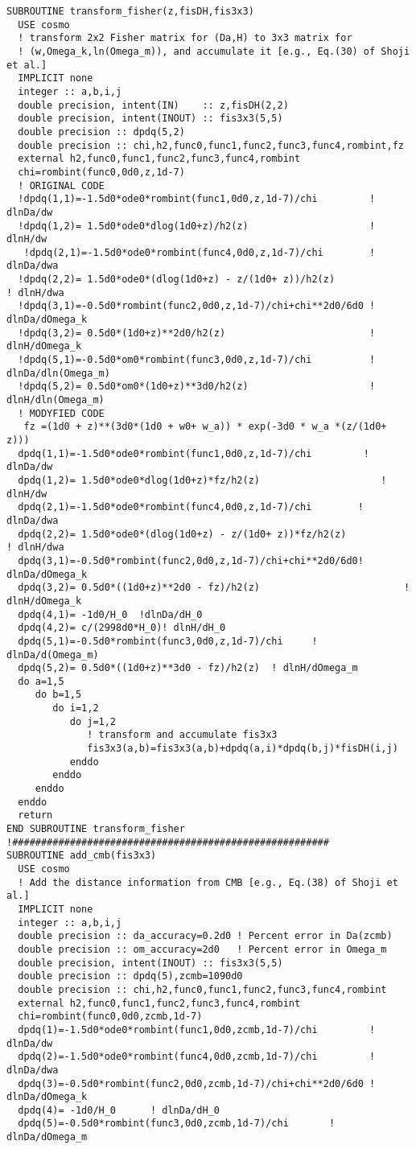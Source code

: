 \documentclass[11pt]{amsart}
\begin{document}
\begin{verbatim}
SUBROUTINE transform_fisher(z,fisDH,fis3x3)
  USE cosmo
  ! transform 2x2 Fisher matrix for (Da,H) to 3x3 matrix for 
  ! (w,Omega_k,ln(Omega_m)), and accumulate it [e.g., Eq.(30) of Shoji et al.]
  IMPLICIT none
  integer :: a,b,i,j
  double precision, intent(IN)    :: z,fisDH(2,2)
  double precision, intent(INOUT) :: fis3x3(5,5)
  double precision :: dpdq(5,2)
  double precision :: chi,h2,func0,func1,func2,func3,func4,rombint,fz
  external h2,func0,func1,func2,func3,func4,rombint
  chi=rombint(func0,0d0,z,1d-7)
  ! ORIGINAL CODE
  !dpdq(1,1)=-1.5d0*ode0*rombint(func1,0d0,z,1d-7)/chi         ! dlnDa/dw
  !dpdq(1,2)= 1.5d0*ode0*dlog(1d0+z)/h2(z)                     ! dlnH/dw
   !dpdq(2,1)=-1.5d0*ode0*rombint(func4,0d0,z,1d-7)/chi        ! dlnDa/dwa
  !dpdq(2,2)= 1.5d0*ode0*(dlog(1d0+z) - z/(1d0+ z))/h2(z)                         ! dlnH/dwa
  !dpdq(3,1)=-0.5d0*rombint(func2,0d0,z,1d-7)/chi+chi**2d0/6d0 ! dlnDa/dOmega_k
  !dpdq(3,2)= 0.5d0*(1d0+z)**2d0/h2(z)                         ! dlnH/dOmega_k
  !dpdq(5,1)=-0.5d0*om0*rombint(func3,0d0,z,1d-7)/chi          ! dlnDa/dln(Omega_m)
  !dpdq(5,2)= 0.5d0*om0*(1d0+z)**3d0/h2(z)                     ! dlnH/dln(Omega_m)
  ! MODYFIED CODE
   fz =(1d0 + z)**(3d0*(1d0 + w0+ w_a)) * exp(-3d0 * w_a *(z/(1d0+ z)))
  dpdq(1,1)=-1.5d0*ode0*rombint(func1,0d0,z,1d-7)/chi         ! dlnDa/dw
  dpdq(1,2)= 1.5d0*ode0*dlog(1d0+z)*fz/h2(z)                     ! dlnH/dw
  dpdq(2,1)=-1.5d0*ode0*rombint(func4,0d0,z,1d-7)/chi        ! dlnDa/dwa
  dpdq(2,2)= 1.5d0*ode0*(dlog(1d0+z) - z/(1d0+ z))*fz/h2(z)                         ! dlnH/dwa
  dpdq(3,1)=-0.5d0*rombint(func2,0d0,z,1d-7)/chi+chi**2d0/6d0! dlnDa/dOmega_k
  dpdq(3,2)= 0.5d0*((1d0+z)**2d0 - fz)/h2(z)                         ! dlnH/dOmega_k
  dpdq(4,1)= -1d0/H_0  !dlnDa/dH_0
  dpdq(4,2)= c/(2998d0*H_0)! dlnH/dH_0
  dpdq(5,1)=-0.5d0*rombint(func3,0d0,z,1d-7)/chi     ! dlnDa/d(Omega_m)
  dpdq(5,2)= 0.5d0*((1d0+z)**3d0 - fz)/h2(z)  ! dlnH/dOmega_m
  do a=1,5
     do b=1,5
        do i=1,2
           do j=1,2
              ! transform and accumulate fis3x3
              fis3x3(a,b)=fis3x3(a,b)+dpdq(a,i)*dpdq(b,j)*fisDH(i,j)
           enddo
        enddo
     enddo
  enddo  
  return
END SUBROUTINE transform_fisher
!#######################################################
SUBROUTINE add_cmb(fis3x3)
  USE cosmo
  ! Add the distance information from CMB [e.g., Eq.(38) of Shoji et al.]
  IMPLICIT none
  integer :: a,b,i,j
  double precision :: da_accuracy=0.2d0 ! Percent error in Da(zcmb) 
  double precision :: om_accuracy=2d0   ! Percent error in Omega_m 
  double precision, intent(INOUT) :: fis3x3(5,5)
  double precision :: dpdq(5),zcmb=1090d0
  double precision :: chi,h2,func0,func1,func2,func3,func4,rombint
  external h2,func0,func1,func2,func3,func4,rombint
  chi=rombint(func0,0d0,zcmb,1d-7)
  dpdq(1)=-1.5d0*ode0*rombint(func1,0d0,zcmb,1d-7)/chi         ! dlnDa/dw
  dpdq(2)=-1.5d0*ode0*rombint(func4,0d0,zcmb,1d-7)/chi         ! dlnDa/dwa
  dpdq(3)=-0.5d0*rombint(func2,0d0,zcmb,1d-7)/chi+chi**2d0/6d0 ! dlnDa/dOmega_k
  dpdq(4)= -1d0/H_0      ! dlnDa/dH_0
  dpdq(5)=-0.5d0*rombint(func3,0d0,zcmb,1d-7)/chi       ! dlnDa/dOmega_m



\end{verbatim}
\end{document}
